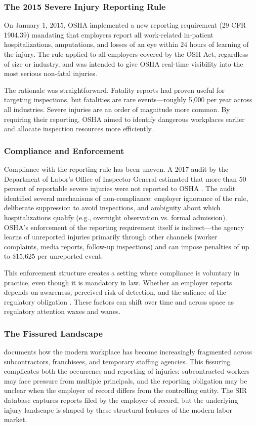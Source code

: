 \documentclass[12pt]{article}
\begin{document}
\subsubsection*{The 2015 Severe Injury Reporting Rule} On January 1, 2015, OSHA implemented a new reporting requirement (29 CFR 1904.39) mandating that employers report all work-related in-patient hospitalizations, amputations, and losses of an eye within 24 hours of learning of the injury. The rule applied to all employers covered by the OSH Act, regardless of size or industry, and was intended to give OSHA real-time visibility into the most serious non-fatal injuries.

The rationale was straightforward. Fatality reports had proven useful for targeting inspections, but fatalities are rare events---roughly 5,000 per year across all industries. Severe injuries are an order of magnitude more common. By requiring their reporting, OSHA aimed to identify dangerous workplaces earlier and allocate inspection resources more efficiently.

\subsubsection*{Compliance and Enforcement} Compliance with the reporting rule has been uneven. A 2017 audit by the Department of Labor's Office of Inspector General estimated that more than 50 percent of reportable severe injuries were not reported to OSHA \citep{doloig2017}. The audit identified several mechanisms of non-compliance: employer ignorance of the rule, deliberate suppression to avoid inspections, and ambiguity about which hospitalizations qualify (e.g., overnight observation vs. formal admission). OSHA's enforcement of the reporting requirement itself is indirect---the agency learns of unreported injuries primarily through other channels (worker complaints, media reports, follow-up inspections) and can impose penalties of up to \$15,625 per unreported event.

This enforcement structure creates a setting where compliance is voluntary in practice, even though it is mandatory in law. Whether an employer reports depends on awareness, perceived risk of detection, and the salience of the regulatory obligation \citep{shimshack2007comply, scholz1997compliance}. These factors can shift over time and across space as regulatory attention waxes and wanes.

\subsubsection*{The Fissured Landscape} \citet{weil2014fissured} documents how the modern workplace has become increasingly fragmented across subcontractors, franchisees, and temporary staffing agencies. This fissuring complicates both the occurrence and reporting of injuries: subcontracted workers may face pressure from multiple principals, and the reporting obligation may be unclear when the employer of record differs from the controlling entity. The SIR database captures reports filed by the employer of record, but the underlying injury landscape is shaped by these structural features of the modern labor market.
\end{document}
